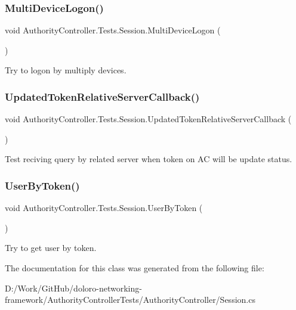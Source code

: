 \subsubsection{\texorpdfstring{Multi\+Device\+Logon()}{MultiDeviceLogon()}}
{\footnotesize\ttfamily void Authority\+Controller.\+Tests.\+Session.\+Multi\+Device\+Logon (\begin{DoxyParamCaption}{ }\end{DoxyParamCaption})}



Try to logon by multiply devices. 

\mbox{\label{class_authority_controller_1_1_tests_1_1_session_ad4cb8f6d25fa80e9d64d174b45144331}} 
\subsubsection{\texorpdfstring{Updated\+Token\+Relative\+Server\+Callback()}{UpdatedTokenRelativeServerCallback()}}
{\footnotesize\ttfamily void Authority\+Controller.\+Tests.\+Session.\+Updated\+Token\+Relative\+Server\+Callback (\begin{DoxyParamCaption}{ }\end{DoxyParamCaption})}



Test reciving query by related server when token on AC will be update status. 

\mbox{\label{class_authority_controller_1_1_tests_1_1_session_ac7fca191024ad023affcc13a9e380788}} 
\subsubsection{\texorpdfstring{User\+By\+Token()}{UserByToken()}}
{\footnotesize\ttfamily void Authority\+Controller.\+Tests.\+Session.\+User\+By\+Token (\begin{DoxyParamCaption}{ }\end{DoxyParamCaption})}



Try to get user by token. 



The documentation for this class was generated from the following file\+:\begin{DoxyCompactItemize}
\item 
D\+:/\+Work/\+Git\+Hub/doloro-\/networking-\/framework/\+Authority\+Controller\+Tests/\+Authority\+Controller/Session.\+cs\end{DoxyCompactItemize}
